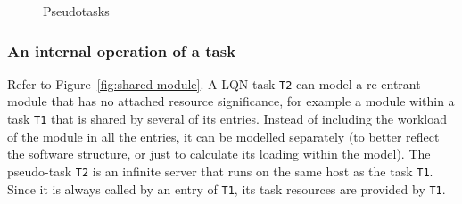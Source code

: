 \documentclass[11pt]{article}
\begin{document}
\begin{figure}
  \quad
  \caption{Pseudotasks}
  \label{fig:pseudotasks}
\end{figure}

\subsubsection{An internal operation of a task}  
Refer to Figure~\ref{fig:shared-module}. A LQN task \texttt{T2} can model a re-entrant
module that has no attached resource significance, for example a module within a task \texttt{T1} that is
shared by several of its entries. Instead of including the workload of the module in all the entries, it
can be modelled separately (to better reflect the software structure, or just to calculate its loading
within the model). The pseudo-task \texttt{T2} is an infinite server that runs on the same host as the task
\texttt{T1}. Since it is always called by an entry of \texttt{T1}, its task resources are provided by \texttt{T1}.
\end{document}
